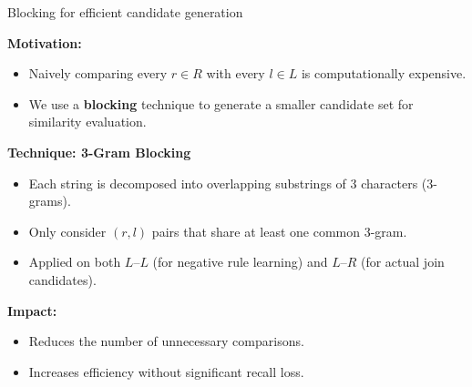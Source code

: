 \documentclass[8pt]{beamer} %
\begin{document}
\begin{frame}{Blocking for efficient candidate generation}
	
	\textbf{Motivation:}
	\begin{itemize}
		\item Naively comparing every $r \in R$ with every $l \in L$ is computationally expensive.
		\item We use a \textbf{blocking} technique to generate a smaller candidate set for similarity evaluation.
	\end{itemize}
	
	\vspace{0.5em}
	\textbf{Technique: 3-Gram Blocking}
	\begin{itemize}
		\item Each string is decomposed into overlapping substrings of 3 characters (3-grams).
		\item Only consider $(r, l)$ pairs that share at least one common 3-gram.
		\item Applied on both $L$–$L$ (for negative rule learning) and $L$–$R$ (for actual join candidates).
	\end{itemize}
	
	\vspace{0.5em}
	\textbf{Impact:}
	\begin{itemize}
		\item Reduces the number of unnecessary comparisons.
		\item Increases efficiency without significant recall loss.
	\end{itemize}
	
\end{frame}
\end{document}

